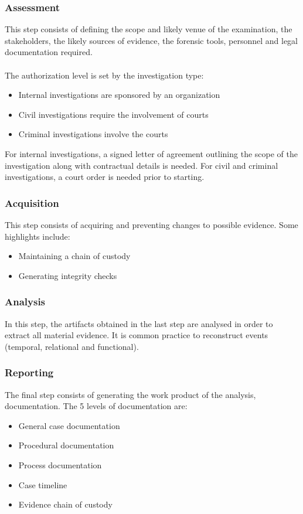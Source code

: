 \documentclass[10pt,a4paper]{report}
\begin{document}
\subsubsection{Assessment}
This step consists of defining the scope and likely venue of the examination, the stakeholders, the likely sources of evidence, the forensic tools, personnel and legal documentation required.\\
\\
The authorization level is set by the investigation type:
\begin{itemize}
\item Internal investigations are sponsored by an organization
\item Civil investigations require the involvement of courts
\item Criminal investigations involve the courts
\end{itemize}
For internal investigations, a signed letter of agreement outlining the scope of the investigation along with contractual details is needed. For civil and criminal investigations, a court order is needed prior to starting.
\subsubsection{Acquisition}
This step consists of acquiring and preventing changes to possible evidence. Some highlights include:
\begin{itemize}
\item Maintaining a chain of custody
\item Generating integrity checks
\end{itemize}
\subsubsection{Analysis}
In this step, the artifacts obtained in the last step are analysed in order to extract all material evidence. It is common practice to reconstruct events (temporal, relational and functional).
\subsubsection{Reporting}
The final step consists of generating the work product of the analysis, documentation. The 5 levels of documentation are:
\begin{itemize}
\item General case documentation
\item Procedural documentation
\item Process documentation
\item Case timeline
\item Evidence chain of custody
\end{itemize}
\end{document}
